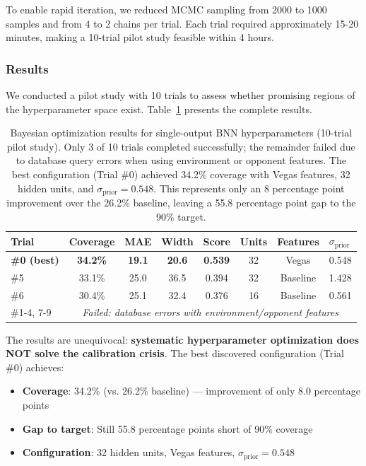 To enable rapid iteration, we reduced MCMC sampling from 2000 to 1000 samples and from 4 to 2 chains per trial. Each trial required approximately 15-20 minutes, making a 10-trial pilot study feasible within 4 hours.

\subsubsection{Results}

We conducted a pilot study with 10 trials to assess whether promising regions of the hyperparameter space exist. Table~\ref{tab:phase4_optimization_results} presents the complete results.

\begin{table}[t]
\centering
\begin{tabular}{@{}lccccccl@{}}
\toprule
\textbf{Trial} & \textbf{Coverage} & \textbf{MAE} & \textbf{Width} & \textbf{Score} & \textbf{Units} & \textbf{Features} & \textbf{$\sigma_{\text{prior}}$} \\
\midrule
\textbf{\#0 (best)} & \textbf{34.2\%} & \textbf{19.1} & \textbf{20.6} & \textbf{0.539} & 32 & Vegas & 0.548 \\
\#5 & 33.1\% & 25.0 & 36.5 & 0.394 & 32 & Baseline & 1.428 \\
\#6 & 30.4\% & 25.1 & 32.4 & 0.376 & 16 & Baseline & 0.561 \\
\#1-4, 7-9 & \multicolumn{7}{c}{\textit{Failed: database errors with environment/opponent features}} \\
\bottomrule
\end{tabular}
\caption{Bayesian optimization results for single-output BNN hyperparameters (10-trial pilot study). Only 3 of 10 trials completed successfully; the remainder failed due to database query errors when using environment or opponent features. The best configuration (Trial \#0) achieved 34.2\% coverage with Vegas features, 32 hidden units, and $\sigma_{\text{prior}} = 0.548$. This represents only an 8 percentage point improvement over the 26.2\% baseline, leaving a 55.8 percentage point gap to the 90\% target.}
\label{tab:phase4_optimization_results}
\end{table}

The results are unequivocal: \textbf{systematic hyperparameter optimization does NOT solve the calibration crisis}. The best discovered configuration (Trial \#0) achieves:

\begin{itemize}
    \item \textbf{Coverage}: 34.2\% (vs. 26.2\% baseline) — improvement of only 8.0 percentage points
    \item \textbf{Gap to target}: Still 55.8 percentage points short of 90\% coverage
    \item \textbf{Configuration}: 32 hidden units, Vegas features, $\sigma_{\text{prior}} = 0.548$
\end{itemize}


